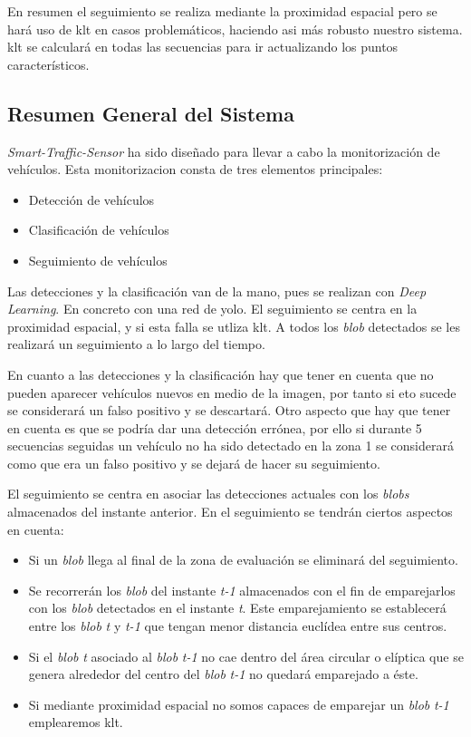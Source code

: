En resumen el seguimiento se realiza mediante la proximidad espacial pero se hará uso de \acrshort{klt} en casos problemáticos, haciendo asi más robusto nuestro sistema. \acrshort{klt} se calculará en todas las secuencias para ir actualizando los puntos característicos.

\subsection{Resumen General del Sistema}

\textit{Smart-Traffic-Sensor} ha sido diseñado para llevar a cabo la monitorización de vehículos.  Esta monitorizacion consta de tres elementos principales:

\begin{itemize}
    \item Detección de vehículos
    \item Clasificación de vehículos
    \item Seguimiento de vehículos
\end{itemize}

Las detecciones y la clasificación van de la mano, pues se realizan con \textit{Deep Learning}. En concreto con una red de \acrshort{yolo}. El seguimiento se centra en la proximidad espacial, y si esta falla se utliza \acrshort{klt}. A todos los \textit{blob} detectados se les realizará un seguimiento a lo largo del tiempo.

En cuanto a las detecciones y la clasificación hay que tener en cuenta que no pueden aparecer vehículos nuevos en medio de la imagen, por tanto si eto sucede se considerará un falso positivo y se descartará. Otro aspecto que hay que tener en cuenta es que se podría dar una detección errónea, por ello si durante 5 secuencias seguidas un vehículo no ha sido detectado en la zona 1 se considerará como que era un falso positivo y se dejará de hacer su seguimiento.

El seguimiento se centra en asociar las detecciones actuales con los \textit{blobs} almacenados del instante anterior. En el seguimiento se tendrán ciertos aspectos en cuenta:

\begin{itemize}
    \item Si un \textit{blob} llega al final de la zona de evaluación se eliminará del seguimiento.
    \item Se recorrerán los \textit{blob} del instante \textit{t-1} almacenados con el fin de emparejarlos con los \textit{blob} detectados en el instante \textit{t}. Este emparejamiento se establecerá entre los \textit{blob} \textit{t} y \textit{t-1} que tengan menor distancia euclídea entre sus centros.
    \item Si el \textit{blob} \textit{t} asociado al \textit{blob} \textit{t-1} no cae dentro del área circular o elíptica que se genera alrededor del centro del  \textit{blob} \textit{t-1} no quedará emparejado a éste. 
    \item Si mediante proximidad espacial no somos capaces de emparejar un \textit{blob} \textit{t-1} emplearemos \acrshort{klt}.
\end{itemize}

